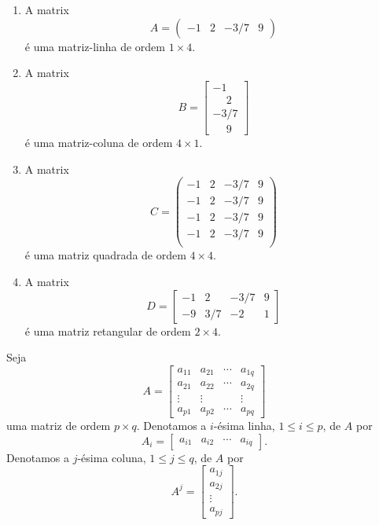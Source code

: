 \begin{exemplo}
  \begin{enumerate}
    \item A matrix
    \[
      A = \begin{pmatrix}
        -1 & 2 & -3/7 & 9
      \end{pmatrix}
    \]
    é uma matriz-linha de ordem $1 \times 4$.
    \item A matrix
    \[
      B = \begin{bmatrix}
        -1 \\ \phantom{-}2 \\ -3/7 \\ \phantom{-}9
      \end{bmatrix}
    \]
    é uma matriz-coluna de ordem $4 \times 1$.
    \item A matrix
    \[
      C = \begin{pmatrix}
        -1 & 2 & -3/7 & 9\\
        -1 & 2 & -3/7 & 9\\
        -1 & 2 & -3/7 & 9\\
        -1 & 2 & -3/7 & 9\\
      \end{pmatrix}
    \]
    é uma matriz quadrada de ordem $4 \times 4$.
    \item A matrix
    \[
      D = \begin{bmatrix}
        -1 & 2 & -3/7 & 9\\
        -9 & 3/7 & -2 & 1
      \end{bmatrix}
    \]
    é uma matriz retangular de ordem $2 \times 4$.
  \end{enumerate}
\end{exemplo}

Seja
\[
  A = \begin{bmatrix}
    a_{11} & a_{21} & \cdots & a_{1q}\\
    a_{21} & a_{22} & \cdots & a_{2q}\\
    \vdots & \vdots & & \vdots\\
    a_{p1} & a_{p2} & \cdots & a_{pq}
  \end{bmatrix}
\]
uma matriz de ordem $p\times q$. Denotamos a $i$-ésima linha, $1 \le i \le p$, de $A$ por
\[
  A_i = \begin{bmatrix}a_{i1} & a_{i2} & \cdots & a_{iq}\end{bmatrix}.
\]
Denotamos a $j$-ésima coluna, $1 \le j \le q$, de $A$ por
\[
  A^j = \begin{bmatrix}a_{1j} \\ a_{2j} \\ \vdots \\ a_{pj}\end{bmatrix}.
\]

